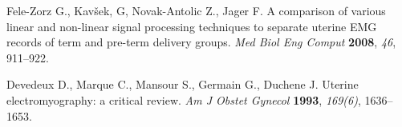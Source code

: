 \documentclass[bioengineering,article,submit,moreauthors,pdftex,10pt,a4paper]{mdpi}
\begin{document}
\begin{thebibliography}{999}
Fele-Zorz G., Kavšek, G, Novak-Antolic Z., Jager F.  A comparison of various linear and non-linear signal processing techniques to separate uterine EMG records of term and pre-term delivery groups. {\em Med Biol Eng Comput} {\bf 2008}, {\em 46}, 911–922.	

Devedeux D., Marque C., Mansour S., Germain G., Duchene J. Uterine electromyography: a critical review. {\em Am J Obstet Gynecol} {\bf 1993}, {\em 169(6)}, 1636–1653.	
	
 




\end{thebibliography}


%


\end{document}
